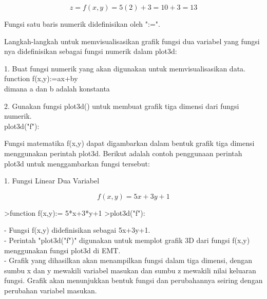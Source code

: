 \documentclass{article}
\begin{document}
\begin{eulernotebook}
\begin{eulercomment}
\begin{eulercomment}
\begin{eulercomment}
\end{eulercomment}
\begin{eulerformula}
\[
z = f(x,y) = 5(2)+3 = 10+3 = 13
\]
\end{eulerformula}
\begin{eulercomment}
\end{eulercomment}
\begin{eulercomment}
Fungsi satu baris numerik didefinisikan oleh ":=".

Langkah-langkah untuk memvisualisasikan grafik fungsi dua variabel
yang fungsi nya didefinisikan sebagai fungsi numerik dalam plot3d:

1. Buat fungsi numerik yang akan digunakan untuk memvisualisasikan
data.\\
function f(x,y):=ax+by\\
dimana a dan b adalah konstanta

2. Gunakan fungsi plot3d() untuk membuat grafik tiga dimensi dari
fungsi numerik.\\
plot3d("f"):

\end{eulercomment}
\begin{eulercomment}
Fungsi matematika f(x,y) dapat digambarkan dalam bentuk grafik tiga
dimensi menggunakan perintah plot3d. Berikut adalah contoh penggunaan
perintah plot3d untuk menggambarkan fungsi tersebut:

1. Fungsi Linear Dua Variabel

\end{eulercomment}
\begin{eulerformula}
\[
f(x,y)=5x+3y+1
\]
\end{eulerformula}
\begin{eulerprompt}
>function f(x,y):= 5*x+3*y+1
>plot3d("f"):
\end{eulerprompt}
\begin{eulercomment}
- Fungsi f(x,y) didefinisikan sebagai 5x+3y+1.\\
- Perintah "plot3d("f")" digunakan untuk memplot grafik 3D dari fungsi
f(x,y) menggunakan fungsi plot3d di EMT.\\
- Grafik yang dihasilkan akan menampilkan fungsi dalam tiga dimensi,
dengan sumbu x dan y mewakili variabel masukan dan sumbu z mewakili
nilai keluaran fungsi. Grafik akan menunjukkan bentuk fungsi dan
perubahannya seiring dengan perubahan variabel masukan.


\end{eulercomment}
\end{eulercomment}
\end{eulercomment}
\end{eulernotebook}
\end{document}
